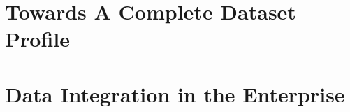 \documentclass[a4paper,11pt,twoside]{ThesisStyle}
\begin{document}
\part{Towards A Complete Dataset Profile} \label{part:dataset_profiling}







\let\cleardoublepage\clearpage
\part{Data Integration in the Enterprise} \label{part:data_integration}









\appendix









\chapter*{}
\chaptermark{}
\vspace{-15ex}
\end{document}
